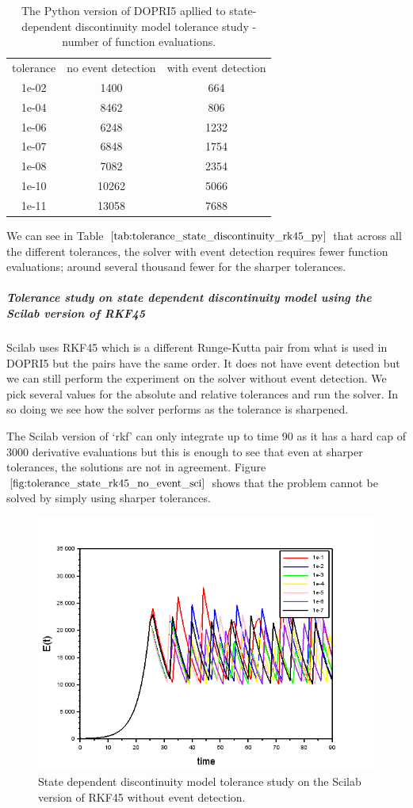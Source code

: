 \begin{table}[h]
\caption {The Python version of DOPRI5 apllied to state-dependent discontinuity model tolerance study - number of function evaluations.} \label{tab:tolerance_state_discontinuity_rk45_py} 
\begin{center}
\begin{tabular}{ c c c }
tolerance & no event detection & with event detection \\
1e-02 & 1400 & 664 \\
1e-04 & 8462 & 806 \\
1e-06 & 6248 & 1232 \\
1e-07 & 6848 & 1754 \\
1e-08 & 7082 & 2354 \\
1e-10 & 10262 & 5066 \\
1e-11 & 13058 & 7688 \\
\end{tabular}
\end{center}
\end{table}

We can see in Table $\ref{tab:tolerance_state_discontinuity_rk45_py}$ that across all the different tolerances, the solver with event detection requires fewer function evaluations; around several thousand fewer for the sharper tolerances. 

\subparagraph{Tolerance study on state dependent discontinuity model using the Scilab version of RKF45}
Scilab uses RKF45 which is a different Runge-Kutta pair from what is used in DOPRI5 but the pairs have the same order. It does not have event detection but we can still perform the experiment on the solver without event detection. We pick several values for the absolute and relative tolerances and run the solver. In so doing we see how the solver performs as the tolerance is sharpened. 

The Scilab version of `rkf' can only integrate up to time 90 as it has a hard cap of 3000 derivative evaluations but this is enough to see that even at sharper tolerances, the solutions are not in agreement. Figure $\ref{fig:tolerance_state_rk45_no_event_sci}$ shows that the problem cannot be solved by simply using sharper tolerances. 
\begin{figure}[h]
\centering
\includegraphics[width=0.7\linewidth]{./figures/tolerance_state_rk45_no_event_sci}
\caption{State dependent discontinuity model tolerance study on the Scilab version of RKF45 without event detection.}
\label{fig:tolerance_state_rk45_no_event_sci}
\end{figure}

